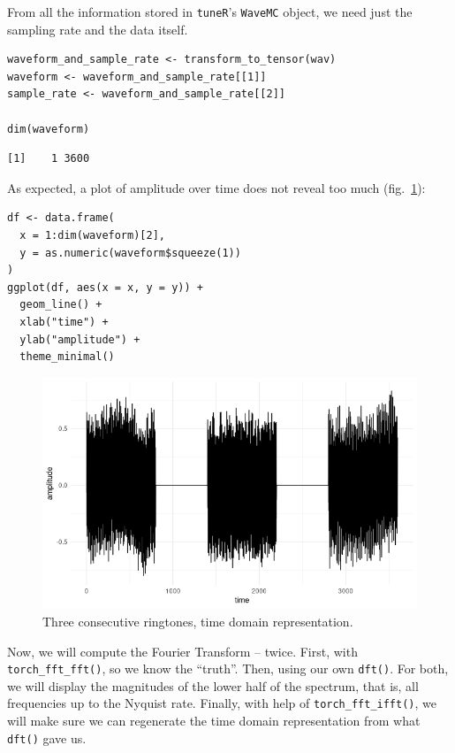 \documentclass[
  letterpaper,
]{krantz}
\begin{document}
From all the information stored in \texttt{tuneR}'s \texttt{WaveMC}
object, we need just the sampling rate and the data itself.

\begin{verbatim}
waveform_and_sample_rate <- transform_to_tensor(wav)
waveform <- waveform_and_sample_rate[[1]]
sample_rate <- waveform_and_sample_rate[[2]]

dim(waveform)
\end{verbatim}

\begin{verbatim}
[1]    1 3600
\end{verbatim}

As expected, a plot of amplitude over time does not reveal too much
(fig.~\ref{fig-dft-dial-waveform}):

\begin{verbatim}
df <- data.frame(
  x = 1:dim(waveform)[2],
  y = as.numeric(waveform$squeeze(1))
)
ggplot(df, aes(x = x, y = y)) +
  geom_line() +
  xlab("time") +
  ylab("amplitude") +
  theme_minimal()
\end{verbatim}

\begin{figure}[H]

{\centering \includegraphics{images/dft-dial-waveform.png}

}

\caption{\label{fig-dft-dial-waveform}Three consecutive ringtones, time
domain representation.}

\end{figure}

Now, we will compute the Fourier Transform -- twice. First, with
\texttt{torch\_fft\_fft()}, so we know the ``truth''. Then, using our
own \texttt{dft()}. For both, we will display the magnitudes of the
lower half of the spectrum, that is, all frequencies up to the Nyquist
rate. Finally, with help of \texttt{torch\_fft\_ifft()}, we will make
sure we can regenerate the time domain representation from what
\texttt{dft()} gave us.
\end{document}
